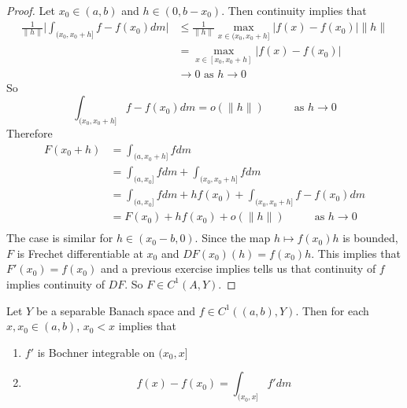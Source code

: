 \documentclass{book}
\begin{document}
	\begin{proof}
	Let $x_0 \in (a,b)$ and $h \in (0, b-x_0)$. Then continuity implies that
	\begin{align*}
	\frac{1}{\|h\|} \bigg | \int_{(x_0, x_0 + h]}f - f(x_0) dm \bigg |
	& \leq  \frac{1}{\|h\|} \max_{x \in (x_0, x_0+h]} |f(x) - f(x_0)| \|h\| \\
	&= \max_{x \in [x_0, x_0+h]} |f(x) - f(x_0)| \\
	& \rightarrow 0  \text{ as } h \rightarrow 0
\end{align*}	  
So $$\int_{(x_0, x_0 + h]}f - f(x_0) dm = o(\|h\|) \hspace{1cm}\text{ as }h \rightarrow 0$$ 
	Therefore 
	\begin{align*}
	F(x_0 + h)
	&= \int_{(a, x_0 + h]} f dm  \\
	&= \int_{(a, x_0]} f dm + \int_{(x_0, x_0 + h]} fdm \\
	&= \int_{(a, x_0]} f dm + hf(x_0) + \int_{(x_0, x_0 + h]} f - f(x_0) dm \\ 
	&= F(x_0 ) + hf(x_0) + o(\|h\|) \hspace{1cm }\text{ as } h \rightarrow 0\\
	\end{align*}
	The case is similar for $h \in (x_0 - b, 0)$. Since the map $h \mapsto f(x_0)h$ is bounded, $F$ is Frechet differentiable at $x_0$ and $DF(x_0)(h) = f(x_0)h$. This implies that $F'(x_0) = f(x_0)$ and a previous exercise implies tells us that continuity of $f$ implies continuity of $DF$. So $F \in C^1(A, Y)$.
	\end{proof}
	
	\begin{ex} \lex{}
	Let $Y$ be a separable Banach space and $f \in C^1((a,b), Y)$. Then for each $x, x_0 \in (a,b)$, $x_0 < x$ implies that 
	\begin{enumerate}
	\item $f'$ is Bochner integrable on $(x_0, x]$ 
	\item  $$f(x) - f(x_0) = \int_{(x_0, x]}f'dm$$ 
	\end{enumerate}
	\end{ex}
\end{document}
